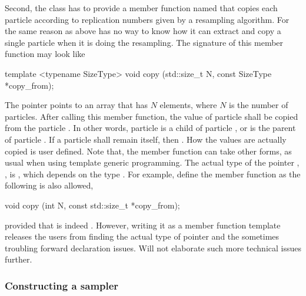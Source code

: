 Second, the class has to provide a member function named  that
copies each particle according to replication numbers given by a resampling
algorithm. For the same reason as above \vsmc has no way to know how it can
extract and copy a single particle when it is doing the resampling. The
signature of this member function may look like
\begin{cppcode}
template <typename SizeType>
void copy (std::size_t N, const SizeType *copy_from);
\end{cppcode}
The pointer  points to an array that has $N$ elements,
where $N$ is the number of particles. After calling this member function, the
value of particle  shall be copied from the particle . In other words, particle  is a child of
particle , or  is the parent
of particle . If a particle  shall remain itself,
then . How the values are actually copied is user
defined. Note that, the member function can take other forms, as usual when
using \cpp template generic programming. The actual type of the pointer
, , is
, which depends on the type .
For example, define the member function as the following is also allowed,
\begin{cppcode}
void copy (int N, const std::size_t *copy_from);
\end{cppcode}
provided that  is indeed
. However, writing it as a member function template
releases the users from finding the actual type of pointer
 and the sometimes troubling forward declaration issues.
Will not elaborate such more technical issues further.

\subsubsection{Constructing a sampler}
\label{ssub:Constructing a sampler}


